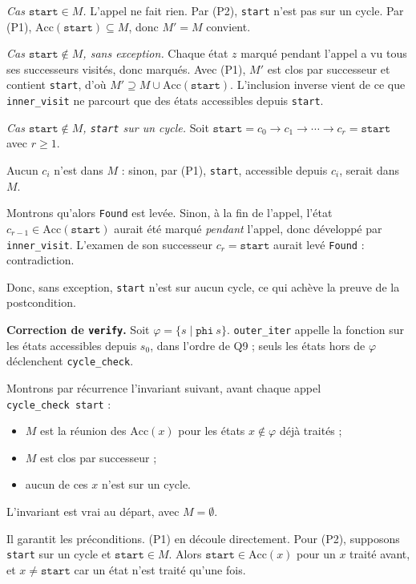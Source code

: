 \documentclass[11pt,a4paper]{article}
\providecommand{\tightlist}{\setlength{\itemsep}{0pt}\setlength{\parskip}{0pt}}
\providecommand{\varnothing}{\emptyset}
\begin{document}
\emph{Cas \(\texttt{start}\in M\).} L'appel ne fait rien. Par (P2), \texttt{start} n'est pas sur un cycle. Par (P1), \(\mathrm{Acc}(\texttt{start})\subseteq M\), donc \(M'=M\) convient.

\emph{Cas \(\texttt{start}\notin M\), sans exception.} Chaque état \(z\) marqué pendant l'appel a vu tous ses successeurs visités, donc marqués. Avec (P1), \(M'\) est clos par successeur et contient \texttt{start}, d'où \(M'\supseteq M\cup\mathrm{Acc}(\texttt{start})\). L'inclusion inverse vient de ce que \texttt{inner\_visit} ne parcourt que des états accessibles depuis \texttt{start}.

\emph{Cas \(\texttt{start}\notin M\), \texttt{start} sur un cycle.} Soit \(\texttt{start}=c_0\to c_1\to\cdots\to c_r=\texttt{start}\) avec \(r\ge1\).

Aucun \(c_i\) n'est dans \(M\) : sinon, par (P1), \texttt{start}, accessible depuis \(c_i\), serait dans \(M\).

Montrons qu'alors \texttt{Found} est levée. Sinon, à la fin de l'appel, l'état \(c_{r-1}\in\mathrm{Acc}(\texttt{start})\) aurait été marqué \emph{pendant} l'appel, donc développé par \texttt{inner\_visit}. L'examen de son successeur \(c_r=\texttt{start}\) aurait levé \texttt{Found} : contradiction.

Donc, sans exception, \texttt{start} n'est sur aucun cycle, ce qui achève la preuve de la postcondition.

\textbf{Correction de \texttt{verify}.} Soit \(\varphi=\{s\mid \texttt{phi}\ s\}\). \texttt{outer\_iter} appelle la fonction sur les états accessibles depuis \(s_0\), dans l'ordre de Q9 ; seuls les états hors de \(\varphi\) déclenchent \texttt{cycle\_check}.

Montrons par récurrence l'invariant suivant, avant chaque appel \texttt{cycle\_check\ start} :

\begin{itemize}
\tightlist
\item
  \(M\) est la réunion des \(\mathrm{Acc}(x)\) pour les états \(x\notin\varphi\) déjà traités ;
\item
  \(M\) est clos par successeur ;
\item
  aucun de ces \(x\) n'est sur un cycle.
\end{itemize}

L'invariant est vrai au départ, avec \(M=\varnothing\).

Il garantit les préconditions. (P1) en découle directement. Pour (P2), supposons \texttt{start} sur un cycle et \(\texttt{start}\in M\). Alors \(\texttt{start}\in\mathrm{Acc}(x)\) pour un \(x\) traité avant, et \(x\neq\texttt{start}\) car un état n'est traité qu'une fois.
\end{document}
